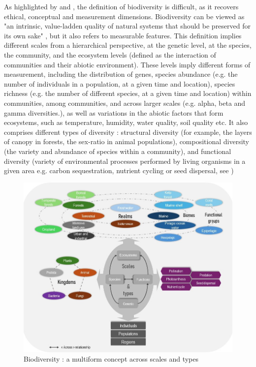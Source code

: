 As highlighted by \cite{VanDyke2008} and \cite{mouysset_diversity_2023}, the definition of biodiversity is difficult, as it recovers ethical, conceptual and measurement dimensions. Biodiversity can be viewed as "an intrinsic, value-ladden quality of natural systems that should be preserved for its own sake" \citep{VanDyke2008, mouysset_diversity_2023}, but it also refers to measurable features.
This definition implies different scales from a hierarchical perspective, at the genetic level, at the species, the community, and the ecosystem levels (defined as the interaction of communities and their abiotic environment). These levels imply different forms of measurement, including the distribution of genes, species abundance (e.g. the number of individuals in a population, at a given time and location), species richness (e.g. the number of different species, at a given time and location) within communities, among communities, and across larger scales (e.g. alpha, beta and gamma diversities.), as well as variations in the abiotic factors that form ecosystems, such as temperature, humidity, water quality, soil quality etc. 
It also comprises different types of diversity : structural diversity (for example, the layers of canopy in forests, the sex-ratio in animal populations), compositional diversity (the variety and abundance of species within a community), and functional diversity (variety of environmental processes performed by living organisms in a given area e.g. carbon sequestration, nutrient cycling or seed dispersal, see \cite{loreau_biodiversity_2002})

\begin{figure}
	\centering
	\includegraphics[width =.8\textwidth]{figures/intro/biodiv_illustration.jpg}
	\caption{Biodiversity : a multiform concept across scales and types}
	\label{fig:intro_biod}
\end{figure}

